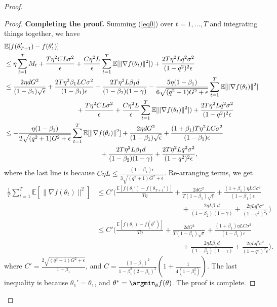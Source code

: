 \documentclass[11pt]{article}
\begin{document}
\begin{proof}
\begin{proof}
\textbf{Completing the proof.} Summing (\ref{eq0}) over $t=1,...,T$ and integrating things together, we have
\begin{align*}
    &\mathbb E[f(\theta_{T+1}')-f(\theta_1')]\\
    &\leq \eta \sum_{t=1}^T M_t+\frac{T\eta^2 CL\sigma^2}{\epsilon}+\frac{C\eta^2 L}{\epsilon} \sum_{t=1}^T \mathbb E[\|\nabla f(\theta_t)\|^2])+\frac{2T\eta^2L q^2\sigma^2}{(1-q^2)^2\epsilon}\\
    &\leq \frac{2\eta dG^2}{(1-\beta_1)\sqrt\epsilon}+\frac{2T\eta^2 \beta_1 LC\sigma^2}{(1-\beta_1)\epsilon}+\frac{2T\eta^2 L\beta_1 d}{(1-\beta_2)(1-\gamma)}- \frac{5\eta(1-\beta_1)}{6\sqrt{(q^2+1)G^2+\epsilon}}\sum_{t=1}^T \mathbb E[\|\nabla f(\theta_t)\|^2]\\
    &\hspace{1.5in} +\frac{T\eta^2 CL\sigma^2}{\epsilon}+\frac{C\eta^2 L}{\epsilon} \sum_{t=1}^T \mathbb E[\|\nabla f(\theta_t)\|^2])+\frac{2T\eta^2L q^2\sigma^2}{(1-q^2)^2\epsilon}\\
    &\leq - \frac{\eta(1-\beta_1)}{2\sqrt{(q^2+1)G^2+\epsilon}}\sum_{t=1}^T \mathbb E[\|\nabla f(\theta_t)\|^2]+\frac{2\eta dG^2}{(1-\beta_1)\sqrt\epsilon}+\frac{(1+\beta_1)T\eta^2 LC\sigma^2}{(1-\beta_1)\epsilon}\\
    &\hspace{2in} +\frac{2T\eta^2 L\beta_1 d}{(1-\beta_2)(1-\gamma)}+\frac{2T\eta^2L q^2\sigma^2}{(1-q^2)^2\epsilon},
\end{align*}
where the last line is because $C\eta L\leq \frac{(1-\beta_1)\epsilon}{3\sqrt{(q^2+1)G^2+\epsilon}}$. Re-arranging terms, we get
\begin{align*}
    \frac{1}{T}\sum_{t=1}^T \mathbb E[\|\nabla f(\theta_t)\|^2]&\leq C'\Big(\frac{\mathbb E[f(\theta_1')-f(\theta_{T+1}')]}{T\eta}+\frac{2dG^2}{T(1-\beta_1)\sqrt\epsilon}+\frac{(1+\beta_1)\eta LC\sigma^2}{(1-\beta_1)\epsilon}\\
    &\hspace{2in} +\frac{2\eta L\beta_1 d}{(1-\beta_2)(1-\gamma)}+\frac{2\eta L q^2\sigma^2}{(1-q^2)^2\epsilon}\Big)\\
    &\leq C'\Big(\frac{\mathbb E[f(\theta_1)-f(\theta^*)]}{T\eta}+\frac{2dG^2}{T(1-\beta_1)\sqrt\epsilon}+\frac{(1+\beta_1)\eta LC\sigma^2}{(1-\beta_1)\epsilon}\\
    &\hspace{2in} +\frac{2\eta L\beta_1 d}{(1-\beta_2)(1-\gamma)}+\frac{2\eta L q^2\sigma^2}{(1-q^2)^2\epsilon}\Big).
\end{align*}
where $C'=\frac{2\sqrt{(q^2+1)G^2+\epsilon}}{1-\beta_1}$, and $C=\frac{(1-\beta_1)^2}{1-\beta_1^2(2-\beta_1)^2}(1+\frac{1}{4(1-\beta_1^2)})$. The last inequality is because $\theta_1'=\theta_1$, and $\theta^*=\argmin_\theta f(\theta)$. The proof is complete.


\end{proof}
\end{proof}
\end{document}
